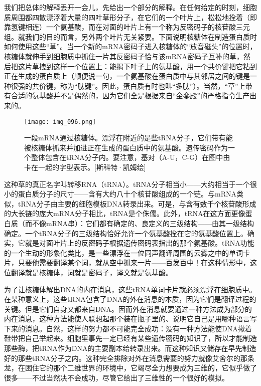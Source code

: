 我们把总体的解释丢开一会儿，先给出一个部分的解释。在任何给定的时刻，细胞质周围都四散漂浮着大量的四叶草形分子，在它们的一个叶片上，松松地拴着（即靠氢键相连）一个氨基酸，而在对面的叶片上有一个称为反密码子的核苷酸三元组。就我们的目的而言，另外两个叶片无关紧要。下面说明核糖体在制造蛋白质时如何使用这些“草”。当一个新的mRNA密码子进入核糖体的“放音磁头”的位置时，核糖体就伸手到细胞质中抓住一片其反密码子恰与该mRNA密码子互补的草，然后把这片草拽到这样一个位置上：能揭下叶子上的氨基酸，用一个共价键把它粘到正在生成的蛋白质上（顺便说一句，一个氨基酸在蛋白质中与其邻居之间的键是一种很强的共价键，称为“肽键”。因此，蛋白质有时也叫“多肽”）。当然，“草”上带有合适的氨基酸并不是偶然的，因为它们全是根据来自“金銮殿”的严格指令生产出来的。

\begin{figure}
\texttt{[image: img\_096.png]}
\caption[一段mRNA通过核糖体。]
  {一段mRNA通过核糖体。漂浮在附近的是些tRNA分子，它们带有能被核糖体抓来并加进正在生成的蛋白质中的氨基酸。遗传密码作为一个整体包含在tRNA分子内。要注意，基对（A-U，C-G）在图中由卡在一起的字型表示。[斯科特·凯姆绘] }
\end{figure}

这种草的真正名字叫转移RNA（tRNA）。tRNA分子相当小——大约相当于一个很小的蛋白质分子的尺寸——含有大约八十个核苷酸组成的一个链。与mRNA类似，tRNA分子由主要的细胞模板DNA转录出来。可是，与含有数千个核苷酸形成的大长链的庞大mRNA分子相比，tRNA是个侏儒。此外，tRNA在这方面更像蛋白质（而不像mRNA串）：它们都有确定的、良定义的三级结构——由其一级结构确定。一个tRNA分子的三级结构恰好允许一个氨基酸拴在它的氨基酸位置上。确实，它就是对面叶片上的反密码子根据遗传密码表指出的那个氨基酸。tRNA功能的一个生动的形象化类比，是一些漂浮在一位同声翻译周围的云雾之中的单词卡片，只要他需要翻译某个词，就从空中抓来一片——百发百中！在这种情形中，这位翻译就是核糖体，词就是密码子，译文就是氨基酸。

为了让核糖体解出DNA的内在消息，这些tRNA单词卡片就必须漂浮在细胞质中。在某种意义上，这些tRNA包含了DNA的外在消息的本质，因为它们是翻译过程的关键。但是它们自身又都来自DNA。因而外在消息就要通过一种方法成为部分的内在消息，这种方法能使人联想起那个装在瓶子里的、说明它自己是用哪种语言写下来的消息。自然，这样的努力都不可能完全成功：没有一种方法能使DNA揪着鞋带把自己举起来。细胞里事先一定已经有某些遗传密码的知识了，所以才能制造那些酶，把tRNA作为DNA的主要副本给转录出来。而这种知识又储存在早先制造好的那些tRNA分子之内。这种完全排除对外在消息需要的努力就像艾舍尔的那条龙，在困住它的那个二维世界的环境中，它竭尽全力想要成为三维的，它似乎做了很多——不过当然决不会成功，尽管它给出了三维性的一个很好的模拟。


